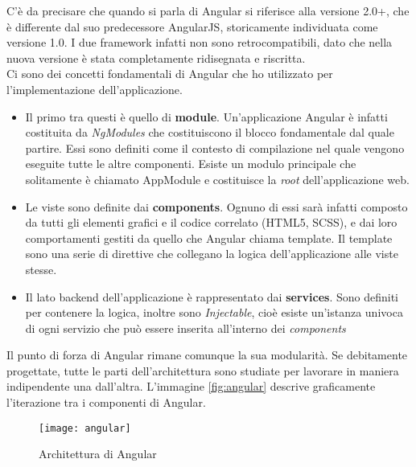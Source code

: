 C'è da precisare che quando si parla di Angular si riferisce alla versione 2.0+, che è differente dal suo predecessore AngularJS,
storicamente individuata come versione 1.0. I due framework infatti non sono retrocompatibili, dato che nella nuova versione è stata
completamente ridisegnata e riscritta. \\
\noindent Ci sono dei concetti fondamentali di Angular che ho utilizzato per l'implementazione
dell'applicazione.
\begin{itemize}
  \item Il primo tra questi è quello di \textbf{module}. Un'applicazione Angular è infatti costituita da \textit{NgModules} che
  costituiscono il blocco fondamentale dal quale partire. Essi sono definiti come il contesto di compilazione nel quale vengono eseguite
  tutte le altre componenti. Esiste un modulo principale che solitamente è chiamato AppModule e costituisce la \textit{root} dell'applicazione web.
  \item Le viste sono definite dai \textbf{components}. Ognuno di essi sarà infatti composto da tutti gli elementi grafici e il codice
  correlato (HTML5, SCSS), e dai loro comportamenti gestiti da quello che Angular chiama template. Il template sono una serie di direttive
  che collegano la logica dell'applicazione alle viste stesse.
  \item  Il lato \gls{backend} dell'applicazione è rappresentato dai \textbf{services}. Sono definiti per contenere la logica, inoltre sono
  \textit{Injectable}, cioè esiste un'istanza univoca di ogni servizio che può essere inserita all'interno dei \textit{components} 
\end{itemize}

Il punto di forza di Angular rimane comunque la sua modularità. Se debitamente progettate, tutte le parti dell'architettura sono studiate
per lavorare in maniera indipendente una dall'altra. 
L'immagine \autoref{fig:angular} descrive graficamente l'iterazione tra i componenti di Angular. 

\begin{figure}[h]
  \texttt{[image: angular]} 
  \caption{Architettura di Angular}
  \label{fig:angular}
\end{figure}

